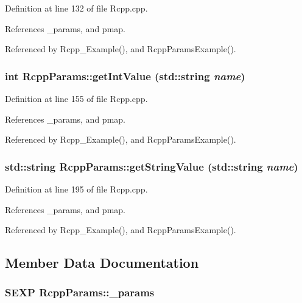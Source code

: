 Definition at line 132 of file Rcpp.cpp.

References \_\-params, and pmap.

Referenced by Rcpp\_\-Example(), and RcppParamsExample().\hypertarget{classRcppParams_bb554151641ab12a793f28d3d081973a}{
\subsubsection[{getIntValue}]{\setlength{\rightskip}{0pt plus 5cm}int RcppParams::getIntValue (std::string {\em name})}}
\label{classRcppParams_bb554151641ab12a793f28d3d081973a}




Definition at line 155 of file Rcpp.cpp.

References \_\-params, and pmap.

Referenced by Rcpp\_\-Example(), and RcppParamsExample().\hypertarget{classRcppParams_dc04f4552582eeec09b0806ddd8e2581}{
\subsubsection[{getStringValue}]{\setlength{\rightskip}{0pt plus 5cm}std::string RcppParams::getStringValue (std::string {\em name})}}
\label{classRcppParams_dc04f4552582eeec09b0806ddd8e2581}




Definition at line 195 of file Rcpp.cpp.

References \_\-params, and pmap.

Referenced by Rcpp\_\-Example(), and RcppParamsExample().

\subsection{Member Data Documentation}
\hypertarget{classRcppParams_3040dda3b32eff66fb73d3ba3874ca5b}{
\subsubsection[{\_\-params}]{\setlength{\rightskip}{0pt plus 5cm}SEXP {\bf RcppParams::\_\-params}}}
\label{classRcppParams_3040dda3b32eff66fb73d3ba3874ca5b}




